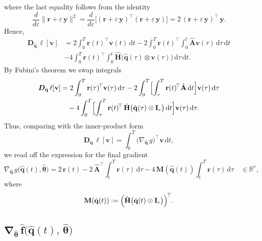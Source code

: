 where the last equality follows from the identity\\
$$\frac{d}{d\varepsilon}\|\mathbf{r} + \varepsilon\,\mathbf{y}\|^2
= \frac{d}{d\varepsilon}\bigl[(\mathbf{r} + \varepsilon\,\mathbf{y})^\top (\mathbf{r} + \varepsilon\,\mathbf{y})\bigr]= 2\,(\mathbf{r} + \varepsilon\,\mathbf{y})^\top\,\mathbf{y}.$$
Hence,\\
\begin{align*}
\bm{D}_{\hat{\mathbf{q}}}\,\ell[\mathbf{v}]&=2\int_{0}^{T}\mathbf{r}(t)^{\!\top}\mathbf{v}(t)\,\mathrm{d}t
-2\int_{0}^{T}\mathbf{r}(t)^{\!\top}\int_{0}^{t}\hat{\mathbf{A}}\mathbf{v}(\tau)\,\mathrm{d}\tau\,\mathrm{d}t\\
&-4\int_{0}^{T}\mathbf{r}(t)^{\!\top}\int_{0}^{t}\hat{\mathbf{H}}\bigl(\hat{\mathbf{q}}(\tau)\otimes\mathbf{v}(\tau)\bigr)\,\mathrm{d}\tau\,\mathrm{d}t.
\end{align*}
By Fubini’s theorem we swap integrals\\
\begin{align*}
\bm{D}_{\hat{\mathbf{q}}}\,\ell[\mathbf{v}]&=2\int_{0}^{T}\mathbf{r}(\tau)^{\!\top}\mathbf{v}(\tau)\,\mathrm{d}\tau-2\int_{0}^{T}\Bigl[\int_{\tau}^{T}\mathbf{r}(t)^{\!\top}\hat{\mathbf{A}}\,\mathrm{d}t\Bigr]\mathbf{v}(\tau)\,\mathrm{d}\tau\\
&\quad-4\int_{0}^{T}\Bigl[\int_{\tau}^{T}\mathbf{r}(t)^{\!\top}\,\hat{\mathbf{H}}\bigl(\hat{\mathbf{q}}(\tau)\otimes\mathbf{I}_r\bigr)\,\mathrm{d}t\Bigr]\mathbf{v}(\tau)\,\mathrm{d}\tau.
\end{align*}
Thus, comparing with the inner-product form\\
$$\bm{D}_{\hat{\mathbf{q}}}\,\ell[\mathbf{v}]=\int_{0}^{T}\bigl(\nabla_{\hat{\mathbf{q}}}\,g\bigr)^{\!\top}\mathbf{v}\,\mathrm{d}t,$$
we read off the expression for the final gradient\\
\begin{equation}
\label{eq:gradient_3}
\nabla_{\hat{\mathbf{q}}}\,g\bigl(\hat{\mathbf{q}}(t),\hat{\bm{\theta}}\bigr)
=2\,\mathbf{r}(t)-2\,\hat{\mathbf{A}}^{\!\top}\int_{t}^{T}\mathbf{r}(\tau)\,\mathrm{d}\tau
-4\,\mathbf{M}(\hat{\mathbf{q}}(t))\int_{t}^{T}\mathbf{r}(\tau)\,\mathrm{d}\tau \quad\in\mathbb{R}^{r},
\end{equation}
where
$$\mathbf{M}(\hat{\mathbf{q}}(t)):=\Bigl(\hat{\mathbf{H}}\bigl(\hat{\mathbf{q}}(t)\otimes\mathbf{I}_r\bigr)\Bigr)^{\!\top}.$$

\subsection{$\bm{\nabla}_{\hat{\bm{\theta}}}\,\hat{\mathbf{f}}\bigl(\hat{\mathbf{q}}(t),\,\hat{\bm{\theta}}\bigr)$}

